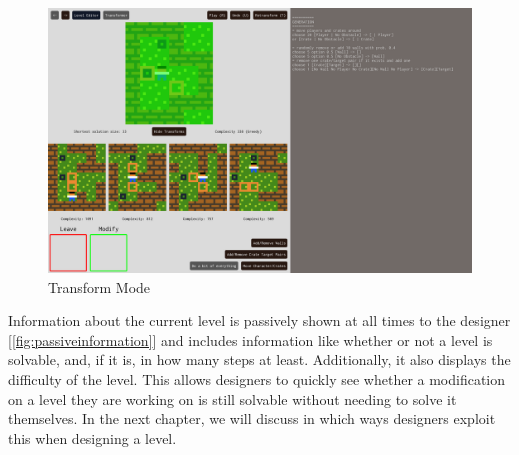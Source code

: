 \begin{figure}
\centering
\includegraphics[width=1.0\linewidth]{figures/imageoftransformmode.png}
\caption[Transformer]{Transform Mode\label{fig:transformermode}}
\end{figure}

Information about the current level is passively shown at all times to the designer [\autoref{fig:passiveinformation}] and includes information like whether or not a level is solvable, and, if it is, in how many steps at least. Additionally, it also displays the difficulty of the level.
This allows designers to quickly see whether a modification on a level they are working on is still solvable without needing to solve it themselves. In the next chapter, we will discuss in which ways designers exploit this when designing a level.



